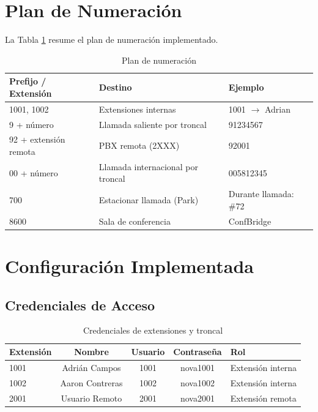 \documentclass[12pt,a4paper]{article}
\begin{document}
\section{Plan de Numeración}

La Tabla \ref{tab:numeración} resume el plan de numeración implementado.

\begin{table}[H]
\centering
\caption{Plan de numeración}
\label{tab:numeración}
\begin{tabular}{@{}p{4cm}p{5cm}p{4.5cm}@{}}
\toprule
\textbf{Prefijo / Extensión} & \textbf{Destino} & \textbf{Ejemplo} \\
\midrule
1001, 1002 & Extensiones internas & 1001 $\rightarrow$ Adrian \\
9 + número & Llamada saliente por troncal & 91234567 \\
92 + extensión remota & PBX remota (2XXX) & 92001 \\
00 + número & Llamada internacional por troncal & 005812345 \\
700 & Estacionar llamada (Park) & Durante llamada: \#72 \\
8600 & Sala de conferencia & ConfBridge \\
\bottomrule
\end{tabular}
\end{table}

\section{Configuración Implementada}

\subsection{Credenciales de Acceso}

\begin{table}[H]
\centering
\caption{Credenciales de extensiones y troncal}
\label{tab:credenciales}
\begin{tabular}{@{}lcccp{3cm}@{}}
\toprule
\textbf{Extensión} & \textbf{Nombre} & \textbf{Usuario} & \textbf{Contraseña} & \textbf{Rol} \\
\midrule
1001 & Adrián Campos & 1001 & nova1001 & Extensión interna \\
1002 & Aaron Contreras & 1002 & nova1002 & Extensión interna \\
2001 & Usuario Remoto & 2001 & nova2001 & Extensión remota \\
\bottomrule
\end{tabular}
\end{table}
\end{document}
